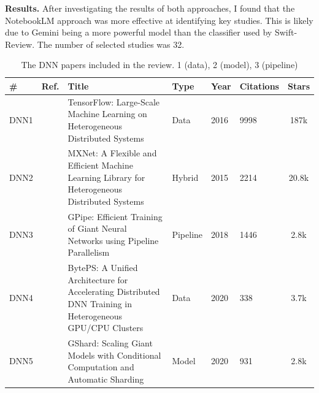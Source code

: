 \textbf{Results.}
After investigating the results of both approaches, I found that the NotebookLM approach was more
effective at identifying key studies. This is likely due to Gemini being a more powerful
model than the classifier used by Swift-Review. The number of selected studies was 32.
\begin{table}[th!]
	\centering
	\caption{The DNN papers included in the review. 1 (data), 2 (model), 3 (pipeline)}
	\label{tab:dnn_papers}
	\begin{tabular}{llp{8.4cm}lllc}
		\hline
		\small \textbf{\#} & \small \textbf{Ref.}                    & \small \textbf{Title}                                                                                                               & \small \textbf{Type} & \small \textbf{Year} & \small \textbf{Citations} & \small \textbf{Stars}                                                \\[1ex]
		\hline
		\small DNN1        & \small \cite{abadi_tensorflow_2016}     & \small TensorFlow: Large-Scale Machine Learning on Heterogeneous Distributed Systems                                                & \small Data          & \small 2016          & \small 9998               & \small 187k \cite{abadi_tensorflow_2015}                             \\[1ex]
		\small DNN2        & \small \cite{chen_mxnet_2015}           & \small MXNet: A Flexible and Efficient Machine Learning Library for Heterogeneous Distributed Systems                               & \small Hybrid        & \small 2015          & \small 2214               & \small 20.8k \cite{noauthor_apachemxnet_2025}                        \\[1ex]
		\small DNN3        & \small \cite{huang_gpipe_2019}          & \small GPipe: Efficient Training of Giant Neural Networks using Pipeline Parallelism                                                & \small Pipeline      & \small 2018          & \small 1446               & \small 2.8k \cite{noauthor_tensorflowlingvo_2025}                    \\[1ex]
		\small DNN4        & \small \cite{jiang_unified_nodate}      & \small BytePS: A Unified Architecture for Accelerating Distributed DNN Training in Heterogeneous GPU/CPU Clusters                   & \small Data          & \small 2020          & \small 338                & \small 3.7k \cite{noauthor_bytedancebyteps_2025}                     \\[1ex]
		\small DNN5        & \small \cite{lepikhin_gshard_2020}      & \small GShard: Scaling Giant Models with Conditional Computation and Automatic Sharding                                             & \small Model         & \small 2020          & \small 931                & \small 2.8k \cite{noauthor_tensorflowlingvo_2025}                    \\[1ex]

\end{tabular}
\end{table}
